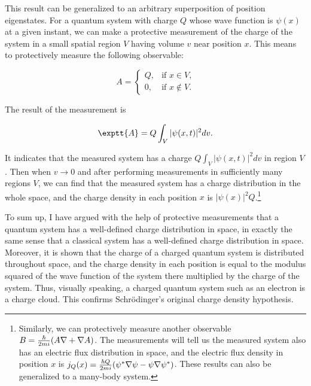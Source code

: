 This result can be generalized to an arbitrary superposition of position eigenstates. For a quantum system with charge $Q$ whose wave function is $\psi(x)$ at a given instant, we can make a protective measurement of the charge of the system in a small spatial region $V$ having volume $v$ near position $x$. This means to protectively measure the following observable:

\begin{equation}
A= 
\begin{cases} 
{Q},& \text{if $x \in V$,}
\\
0,&\text{if $x \not\in V$.} 
\end{cases}
\end{equation}

\noindent The result of the measurement is

\begin{equation}
\exptt{A} = {Q}\int_{V}|\psi(x,t)|^2 dv.
\end{equation}
\noindent

\noindent  It indicates that the measured system has a charge ${Q}\int_{V}|\psi(x,t)|^2 dv$ in region $V$. Then when $v \rightarrow 0$ and after performing measurements in sufficiently many regions $V$, we can find that the measured system has a charge distribution in the whole space, and the charge density  in each position $x$ is $|\psi(x)|^2Q$.\footnote{Similarly, we can protectively measure another observable $B ={\hbar \over{2mi}}(A\nabla + \nabla A)$. The measurements will tell us the measured system also has an electric flux distribution in space, and the electric flux density in position $x$ is $j_Q(x) ={\hbar Q\over{2mi}}(\psi^* \nabla \psi - \psi  \nabla \psi^* )$. These results can also be generalized to a many-body system.}

To sum up, I have argued with the help of  protective measurements that a quantum system has a well-defined charge distribution in space, in exactly the same sense that a classical system has a well-defined charge distribution in space. Moreover, it is shown that the charge of a charged quantum system is distributed throughout space, and the charge density in each position is equal to the modulus squared of the wave function of the system there multiplied by the charge of the system. 
Thus, visually speaking, a charged quantum system such as an electron is a charge cloud.
This confirms Schr\"{o}dinger's original charge density hypothesis.

